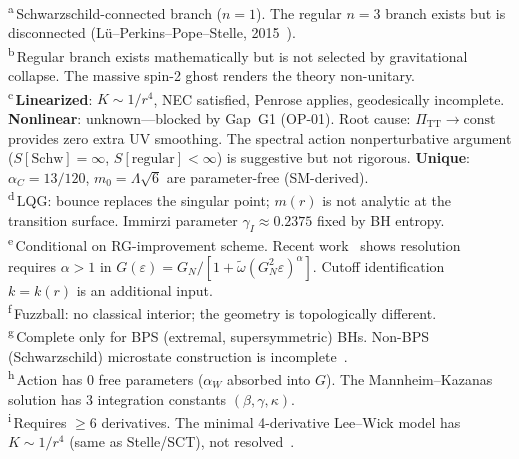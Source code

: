 \begin{table}[p]
\vspace{4pt}
\footnotesize
\textsuperscript{a}\,Schwarzschild-connected branch ($n\!=\!1$).
  The regular $n\!=\!3$ branch exists but is disconnected
  (L\"u--Perkins--Pope--Stelle, 2015~\cite{LPPS2015}).\\
\textsuperscript{b}\,Regular branch exists mathematically but is
  not selected by gravitational collapse.
  The massive spin-2 ghost renders the theory non-unitary.\\
\textsuperscript{c}\,\textbf{Linearized}: $K \sim 1/r^4$, NEC satisfied,
  Penrose applies, geodesically incomplete.
  \textbf{Nonlinear}: unknown---blocked by Gap~G1 (OP-01).
  Root cause: $\Pi_{\mathrm{TT}} \to \mathrm{const}$ provides zero extra UV smoothing.
  The spectral action nonperturbative argument
  ($S[\mathrm{Schw}] = \infty$, $S[\mathrm{regular}] < \infty$) is suggestive
  but not rigorous.
  \textbf{Unique}: $\alpha_C = 13/120$, $m_0 = \Lambda\sqrt{6}$ are
  parameter-free (SM-derived).\\
\textsuperscript{d}\,LQG: bounce replaces the singular point;
  $m(r)$ is not analytic at the transition surface.
  Immirzi parameter $\gamma_I \approx 0.2375$ fixed by BH entropy.\\
\textsuperscript{e}\,Conditional on RG-improvement scheme.
  Recent work~\cite{WangGongPapa2025} shows resolution requires
  $\alpha > 1$ in $G(\varepsilon) = G_N/[1 + \tilde\omega(G_N^2\varepsilon)^\alpha]$.
  Cutoff identification $k = k(r)$ is an additional input.\\
\textsuperscript{f}\,Fuzzball: no classical interior; the geometry is
  topologically different.\\
\textsuperscript{g}\,Complete only for BPS (extremal, supersymmetric) BHs.
  Non-BPS (Schwarzschild) microstate construction is
  incomplete~\cite{WarnerBena2022}.\\
\textsuperscript{h}\,Action has 0 free parameters ($\alpha_W$ absorbed into $G$).
  The Mannheim--Kazanas solution has 3 integration constants
  $(\beta, \gamma, \kappa)$.\\
\textsuperscript{i}\,Requires $\geq 6$ derivatives.
  The minimal 4-derivative Lee--Wick model has $K \sim 1/r^4$
  (same as Stelle/SCT), not resolved~\cite{Modesto2016LW}.
\end{table}



